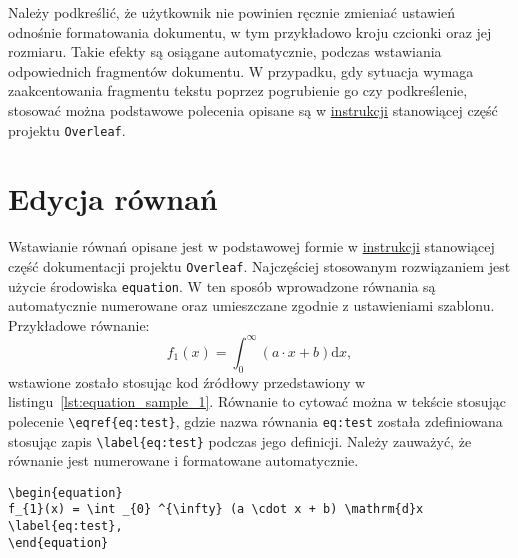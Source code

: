Należy podkreślić, że użytkownik nie powinien ręcznie zmieniać ustawień odnośnie formatowania dokumentu, w tym przykładowo kroju czcionki oraz jej rozmiaru. Takie efekty są osiągane automatycznie, podczas wstawiania odpowiednich fragmentów dokumentu. W przypadku, gdy sytuacja wymaga zaakcentowania fragmentu tekstu poprzez pogrubienie go czy podkreślenie, stosować można podstawowe polecenia opisane są w \href{https://www.overleaf.com/learn/latex/Font_sizes%2C_families%2C_and_styles}{instrukcji} stanowiącej część projektu \texttt{Overleaf}.

\section{Edycja równań}

Wstawianie równań opisane jest w podstawowej formie w \href{https://www.overleaf.com/learn/latex/Mathematical_expressions}{instrukcji} stanowiącej część dokumentacji projektu \texttt{Overleaf}. Najczęściej stosowanym rozwiązaniem jest użycie środowiska \verb|equation|. W ten sposób wprowadzone równania są automatycznie numerowane oraz umieszczane zgodnie z ustawieniami szablonu. Przykładowe równanie:
\begin{equation}
f_{1}(x) = \int _{0} ^{\infty} (a \cdot x + b) \mathrm{d}x \label{eq:equation_sample_1},
\end{equation}
wstawione zostało stosując kod źródłowy przedstawiony w listingu~\ref{lst:equation_sample_1}. Równanie to cytować można w tekście stosując polecenie \verb|\eqref{eq:test}|, gdzie nazwa równania \verb|eq:test| została zdefiniowana stosując zapis \verb|\label{eq:test}| podczas jego definicji. Należy zauważyć, że równanie jest numerowane i formatowane automatycznie.

\begin{listing}[htb]
\begin{verbatim}
\begin{equation}
f_{1}(x) = \int _{0} ^{\infty} (a \cdot x + b) \mathrm{d}x \label{eq:test},
\end{equation}
\end{verbatim}
\end{listing}

